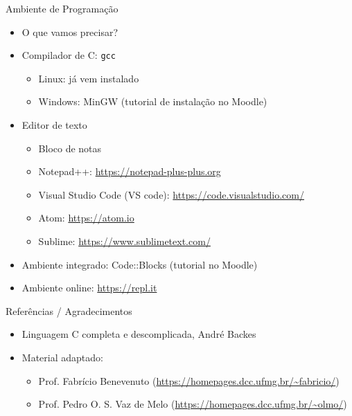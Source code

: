 \documentclass[t, aspectratio=169]{beamer}
\begin{document}
\begin{frame}[label={sec:org95f0b95},fragile]{Ambiente de Programação}
 \begin{itemize}
\item O que vamos precisar?

\item Compilador de C: \texttt{gcc}
\begin{itemize}
\item Linux: já vem instalado
\item Windows: MinGW (tutorial de instalação no Moodle)
\end{itemize}

\item Editor de texto
\begin{itemize}
\item Bloco de notas
\item Notepad++: \url{https://notepad-plus-plus.org}
\item Visual Studio Code (VS code): \url{https://code.visualstudio.com/}
\item Atom: \url{https://atom.io}
\item Sublime: \url{https://www.sublimetext.com/}
\end{itemize}

\item Ambiente integrado: Code::Blocks (tutorial no Moodle)
\item Ambiente online: \url{https://repl.it}
\end{itemize}
\end{frame}

\begin{frame}[label={sec:org58fec9c}]{Referências / Agradecimentos}
\begin{itemize}
\item Linguagem C completa e descomplicada, André Backes
\item Material adaptado:
\begin{itemize}
\item Prof. Fabrício Benevenuto (\url{https://homepages.dcc.ufmg.br/\~fabricio/})
\item Prof. Pedro O. S. Vaz de Melo (\url{https://homepages.dcc.ufmg.br/\~olmo/})
\end{itemize}
\end{itemize}
\end{frame}
\end{document}

